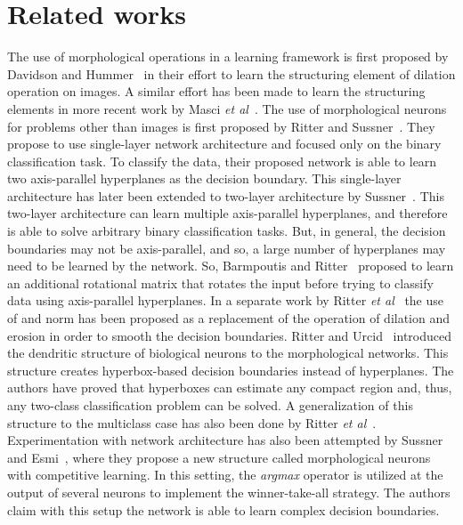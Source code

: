 \documentclass{bmvc2k}
\def\etal{\emph{et al}\bmvaOneDot}
\begin{document}
\section{Related works}
\label{sec:rel_work}
The use of morphological operations in a learning framework is first proposed by Davidson and Hummer~\cite{davidson_morphology_1993} in their effort to learn the structuring element of dilation operation on images. A similar effort has been made to learn the structuring elements in more recent work by Masci \etal{}~\cite{masci2013learning}. The use of morphological neurons for problems other than images is first proposed by Ritter and Sussner~\cite{ritter_introduction_1996}. They propose to use single-layer network architecture and focused only on the binary classification task. To classify the data, their proposed network is able to learn two axis-parallel hyperplanes as the decision boundary. This single-layer architecture has later been extended to two-layer architecture by Sussner~\cite{sussner_morphological_1998}. This two-layer architecture can learn multiple axis-parallel hyperplanes, and therefore is able to solve arbitrary binary classification tasks. But, in general, the decision boundaries may not be axis-parallel, and so, a large number of hyperplanes may need to be learned by the network. So, Barmpoutis and Ritter~\cite{barmpoutis_orthonormal_2006} proposed to learn an additional rotational matrix that rotates the input before trying to classify data using axis-parallel hyperplanes. 
In a separate work by Ritter \etal{}~\cite{ritter_two_2014} the use of  and  norm has been proposed as a replacement of the  operation of dilation and erosion in order to smooth the decision boundaries. 
Ritter and Urcid~\cite{ritter_lattice_2003} introduced the dendritic structure of biological neurons to the morphological networks. This structure creates hyperbox-based decision boundaries instead of hyperplanes. The authors have proved that hyperboxes can estimate any compact region and, thus, any two-class classification problem can be solved. A generalization of this structure to the multiclass case has also been done by Ritter \etal{}~\cite{ritter_learning_2007}. Experimentation with network architecture has also been attempted by Sussner and Esmi~\cite{sussner_morphological_2011}, where they propose a new structure called morphological neurons with competitive learning. In this setting, the \emph{argmax} operator is utilized at the output of several neurons to implement the winner-take-all strategy. The authors claim with this setup the network is able to learn complex decision boundaries. 
\end{document}
